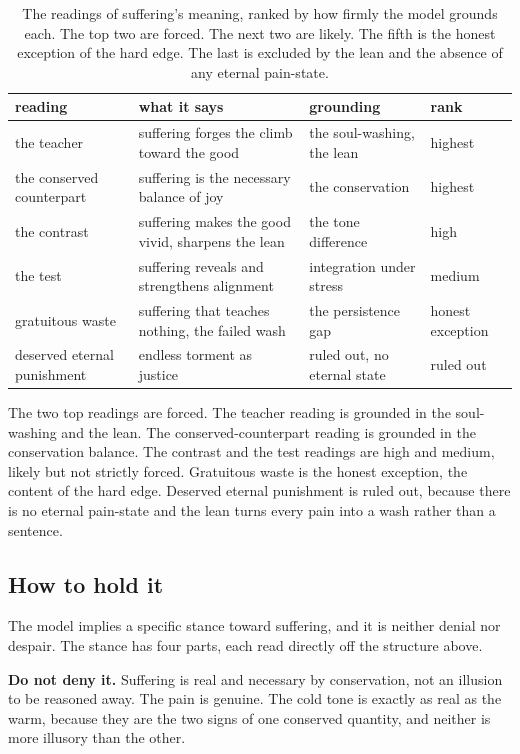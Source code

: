 \begin{table}[ht]
\centering
\begin{tabular}{@{}p{2.7cm}p{4.6cm}p{3.4cm}p{2.4cm}@{}}
\toprule
reading & what it says & grounding & rank \\
\midrule
the teacher & suffering forges the climb toward the good & the soul-washing, the lean & highest \\
the conserved counterpart & suffering is the necessary balance of joy & the conservation & highest \\
the contrast & suffering makes the good vivid, sharpens the lean & the tone difference & high \\
the test & suffering reveals and strengthens alignment & integration under stress & medium \\
gratuitous waste & suffering that teaches nothing, the failed wash & the persistence gap & honest exception \\
deserved eternal punishment & endless torment as justice & ruled out, no eternal state & ruled out \\
\bottomrule
\end{tabular}
\caption{The readings of suffering's meaning, ranked by how firmly the model grounds each. The top two are forced. The next two are likely. The fifth is the honest exception of the hard edge. The last is excluded by the lean and the absence of any eternal pain-state.}
\label{tab:suffering-readings}
\end{table}

The two top readings are forced. The teacher reading is grounded in the soul-washing and the lean. The conserved-counterpart reading is grounded in the conservation balance. The contrast and the test readings are high and medium, likely but not strictly forced. Gratuitous waste is the honest exception, the content of the hard edge. Deserved eternal punishment is ruled out, because there is no eternal pain-state and the lean turns every pain into a wash rather than a sentence.

\subsection{How to hold it}

The model implies a specific stance toward suffering, and it is neither denial nor despair. The stance has four parts, each read directly off the structure above.

\textbf{Do not deny it.} Suffering is real and necessary by conservation, not an illusion to be reasoned away. The pain is genuine. The cold tone is exactly as real as the warm, because they are the two signs of one conserved quantity, and neither is more illusory than the other.

